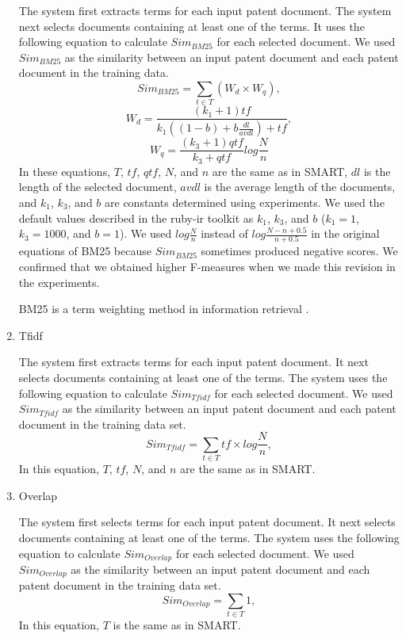 \documentclass[english]{jnlp_1.2c}
\begin{document}
\begin{enumerate}
The system first extracts terms for each input patent document. 
The system next selects documents containing at least 
one of the terms. 
It uses the following equation to calculate $Sim_{BM25}$
for each selected document. 
We used $Sim_{BM25}$ as 
the similarity between an input patent document and 
each patent document in the training data.
\begin{equation}
Sim_{BM25} = \sum_{t \in T} (W_d \times W_q),
\end{equation}
\begin{equation}
W_d = \frac{(k_1 + 1) tf}{k_1 ((1-b) + b \frac{dl}{avdl}) + tf},
\end{equation}
\begin{equation}
W_q = \frac{(k_3 + 1)qtf}{k_3 + qtf} log \frac{N}{n}
\end{equation}
In these equations, 
$T$, $tf$, $qtf$, $N$, and $n$ are 
the same as in SMART,
$dl$ is the length of the selected document,
$avdl$ is the average length of the documents, and
$k_1$, $k_3$, and $b$ are constants determined using experiments.
We used the default values described in the ruby-ir toolkit as $k_1$, $k_3$, and $b$
($k_1 = 1$, $k_3 = 1000$, and $b = 1$).
We used $log \frac{N}{n}$ instead of 
$log \frac{N - n + 0.5}{n + 0.5}$ in the original equations of BM25 
because $Sim_{BM25}$ sometimes produced negative scores. 
We confirmed that we obtained higher F-measures 
when we made this revision in the experiments. 

BM25 is a term weighting method in information retrieval \cite{robertson_trec3_2,murata_irex_ir_nlp_eng_2,Iwayama_2004}. 

\item 
Tfidf

The system first extracts terms for each input patent document. 
It next selects documents containing at least 
one of the terms.
The system uses the following equation to calculate $Sim_{Tfidf}$
for each selected document. 
We used $Sim_{Tfidf}$ as 
the similarity between an input patent document and 
each patent document in the training data set.
\begin{equation}
Sim_{Tfidf} = \sum_{t \in T} tf \times log \frac{N}{n},
\end{equation}
In this equation, 
$T$, $tf$, $N$, and $n$ are the same as in SMART. 

\item 
Overlap

The system first selects terms for each input patent document. 
It next selects documents containing at least 
one of the terms.
The system uses the following equation to calculate $Sim_{Overlap}$
for each selected document. 
We used $Sim_{Overlap}$ as 
the similarity between an input patent document and 
each patent document in the training data set.
\begin{equation}
Sim_{Overlap} = \sum_{t \in T} 1,
\end{equation}
In this equation, 
$T$ is the same as in SMART. 
\end{enumerate}
\end{document}
